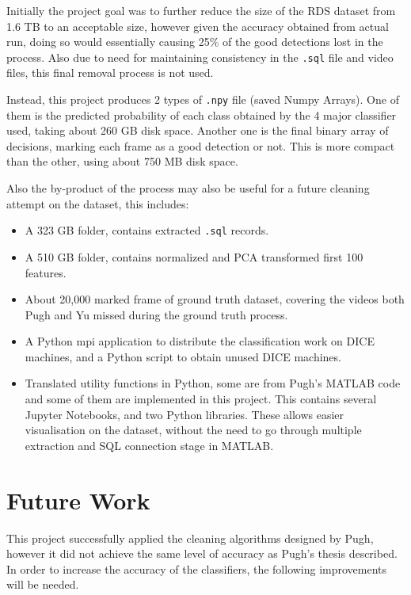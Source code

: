 \documentclass[bsc,logo,twoside,fullspacing,parskip]{infthesis}
\begin{document}
Initially the project goal was to further reduce the size of the RDS dataset from 1.6 TB to an acceptable size, however given the accuracy obtained from actual run, doing so would essentially causing 25\% of the good detections lost in the process. Also due to need for maintaining consistency in the {\tt .sql} file and video files, this final removal process is not used.

Instead, this project produces 2 types of {\tt .npy} file (saved Numpy Arrays). 
One of them is the predicted probability of each class obtained by the 4 major classifier used, taking about 260 GB disk space. 
Another one is the final binary array of decisions, marking each frame as a good detection or not. 
This is more compact than the other, using about 750 MB disk space.

Also the by-product of the process may also be useful for a future cleaning attempt on the dataset, this includes:
\begin{itemize}
\item A 323 GB folder, contains extracted {\tt .sql} records.
\item A 510 GB folder, contains normalized and PCA transformed first 100 features.
\item About 20,000 marked frame of ground truth dataset, covering the videos both Pugh and Yu missed during the ground truth process.
\item A Python mpi application to distribute the classification work on DICE machines, and a Python script to obtain unused DICE machines.
\item Translated utility functions in Python, some are from Pugh's MATLAB code and some of them are implemented in this project. 
This contains several Jupyter Notebooks, and two Python libraries. 
These allows easier visualisation on the dataset, without the need to go through multiple extraction and SQL connection stage in MATLAB. 
\end{itemize}


\section{Future Work}
\label{sec:future}

This project successfully applied the cleaning algorithms designed by Pugh\cite{Pugh}, however it did not achieve the same level of accuracy as Pugh's thesis described.
In order to increase the accuracy of the classifiers, the following improvements will be needed.
\end{document}
